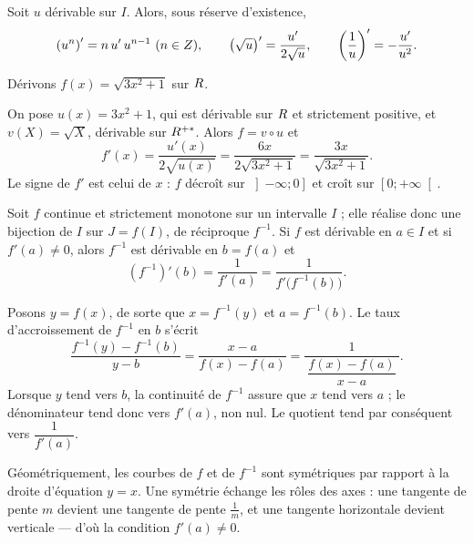 
\begin{propriete}
Soit $u$ dérivable sur $I$. Alors, sous réserve d'existence,
\[
  \left(u^{n}\right)' = n\,u'\,u^{n-1} \ (n \in Z), \qquad
  \left(\sqrt{u}\right)' = \frac{u'}{2\sqrt{u}}, \qquad
  \left(\frac{1}{u}\right)' = -\frac{u'}{u^{2}}.
\]
\end{propriete}

\begin{exemple}
Dérivons $f(x) = \sqrt{3x^{2}+1}$ sur $R$.

On pose $u(x) = 3x^{2}+1$, qui est dérivable sur $R$ et strictement positive,
et $v(X) = \sqrt{X}$, dérivable sur $R^{+*}$. Alors $f = v \circ u$ et
\[
  f'(x) = \frac{u'(x)}{2\sqrt{u(x)}} = \frac{6x}{2\sqrt{3x^{2}+1}}
        = \frac{3x}{\sqrt{3x^{2}+1}} .
\]
Le signe de $f'$ est celui de $x$ : $f$ décroît sur $\left]-\infty ; 0\right]$
et croît sur $\left[0 ; +\infty\right[$.
\end{exemple}

\begin{theoreme}
Soit $f$ continue et strictement monotone sur un intervalle $I$ ; elle réalise
donc une bijection de $I$ sur $J = f(I)$, de réciproque $f^{-1}$. Si $f$ est
dérivable en $a \in I$ et si $f'(a) \neq 0$, alors $f^{-1}$ est dérivable en
$b = f(a)$ et
\[
  \left(f^{-1}\right)'(b) = \frac{1}{f'(a)} = \frac{1}{f'\bigl(f^{-1}(b)\bigr)} .
\]
\end{theoreme}

\begin{demonstration}
Posons $y = f(x)$, de sorte que $x = f^{-1}(y)$ et $a = f^{-1}(b)$. Le taux
d'accroissement de $f^{-1}$ en $b$ s'écrit
\[
  \frac{f^{-1}(y)-f^{-1}(b)}{y-b} = \frac{x-a}{f(x)-f(a)}
  = \frac{1}{\ \dfrac{f(x)-f(a)}{x-a}\ }.
\]
Lorsque $y$ tend vers $b$, la continuité de $f^{-1}$ assure que $x$ tend vers
$a$ ; le dénominateur tend donc vers $f'(a)$, non nul. Le quotient tend par
conséquent vers $\dfrac{1}{f'(a)}$.
\end{demonstration}

\begin{remarque}
Géométriquement, les courbes de $f$ et de $f^{-1}$ sont symétriques par
rapport à la droite d'équation $y = x$. Une symétrie échange les rôles des
axes : une tangente de pente $m$ devient une tangente de pente $\frac{1}{m}$,
et une tangente horizontale devient verticale — d'où la condition
$f'(a) \neq 0$.
\end{remarque}


